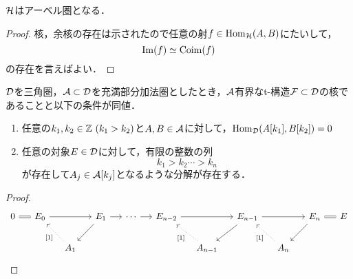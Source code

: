 \begin{thm}\cite{BBD}
	${\mathcal H}$はアーベル圏となる．
\end{thm}
\begin{proof}
	核，余核の存在は示されたので任意の射$f\in\operatorname{\mathrm{Hom}}_{{\mathcal H}}(A,B)$にたいして，
\[\Im(f)\simeq \mathrm{Coim}(f)\]
の存在を言えばよい．
\end{proof}

\begin{lemm}
	${\mathcal D}$を三角圏，${\mathcal A}\subset{\mathcal D}$を充満部分加法圏としたとき，${\mathcal A}$有界なt-構造${\mathcal F}\subset{\mathcal D}$の核であることと以下の条件が同値．\vspace{-3mm}
	\begin{enumerate}[label=\roman*.]
		\item
			任意の$k_1,k_2\in\ZZ\ (k_1>k_2)$と$A,B\in{\mathcal A}$に対して，$\operatorname{\mathrm{Hom}}_{{\mathcal D}}(A[k_1],B[k_2])=0$
		\item
			任意の対象$E\in{\mathcal D}$に対して，有限の整数の列
			\[k_1>k_2 \cdots > k_n\]
			が存在して$A_j\in {\mathcal A}[k_j]$となるような分解が存在する．
	\end{enumerate}
\end{lemm}
\begin{proof}
	\[
		\begin{tikzcd}[column sep=1.3em]
			0\ar[r,equal]&E_0\ar[rr]& & E_{1}\ar[r]\ar[ld] &\cdots\ar[r] &E_{n-2}\ar[rr]&&E_{n-1}\ar[ld]\ar[rr]&&E_n\ar[ld]\ar[r,equal]&E\\
									 &&A_{1}\ar[lu,dotted,"{[1]}"] &&&&A_{n-1}\ar[lu,dotted,"{[1]}"]&&A_n\ar[lu,dotted,"{[1]}"]
		\end{tikzcd}
	\]
				
	\end{proof}
